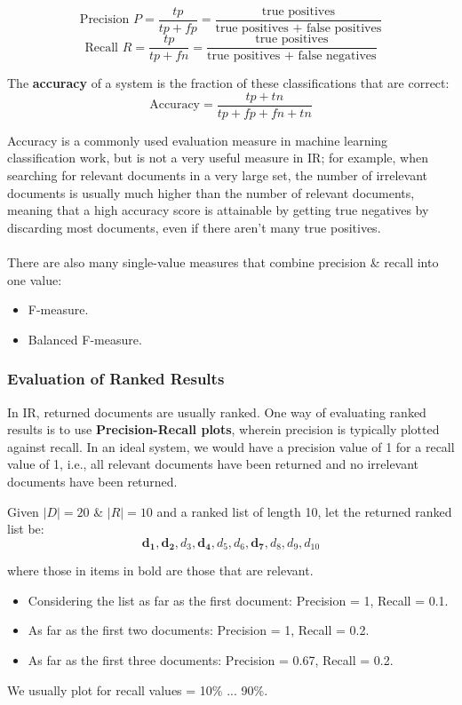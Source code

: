 \documentclass[a4paper,11pt]{article}
\begin{document}
$$
\text{Precision } P = \frac{tp}{tp + fp} = \frac{\text{true positives}}{\text{true positives + false positives}}
$$
$$
\text{Recall } R = \frac{tp}{tp + fn} = \frac{\text{true positives}}{\text{true positives + false negatives}}
$$

The \textbf{accuracy} of a system is the fraction of these classifications that are correct:
$$
\text{Accuracy} = \frac{tp + tn}{tp +fp + fn + tn}
$$

Accuracy is a commonly used evaluation measure in machine learning classification work, but is not a very useful
measure in IR; for example, when searching for relevant documents in a very large set, the number of irrelevant
documents is usually much higher than the number of relevant documents, meaning that a high accuracy score is
attainable by getting true negatives by discarding most documents, even if there aren't many true positives. 
\\\\
There are also many single-value measures that combine precision \& recall into one value:
\begin{itemize}
    \item   F-measure.
    \item   Balanced F-measure.
\end{itemize}

\subsubsection{Evaluation of Ranked Results}
In IR, returned documents are usually ranked.
One way of evaluating ranked results is to use \textbf{Precision-Recall plots}, wherein precision is typically
plotted against recall.
In an ideal system, we would have a precision value of 1 for a recall value of 1, i.e., all relevant documents
have been returned and no irrelevant documents have been returned.

\begin{tcolorbox}[colback=gray!10, colframe=black, title=\textbf{Example}]
    Given $|D| = 20$ \& $|R| = 10$ and a ranked list of length 10, let the returned ranked list be:
    $$
    \mathbf{d_1}, \mathbf{d_2}, d_3, \mathbf{d_4}, d_5, d_6, \mathbf{d_7}, d_8, d_9, d_{10}
    $$

    where those in items in bold are those that are relevant.
    \begin{itemize}
        \item   Considering the list as far as the first document: Precision = 1, Recall = 0.1.
        \item   As far as the first two documents: Precision = 1, Recall = 0.2.
        \item   As far as the first three documents: Precision = 0.67, Recall = 0.2.
    \end{itemize}

    We usually plot for recall values = 10\% ... 90\%.
\end{tcolorbox}
\end{document}
